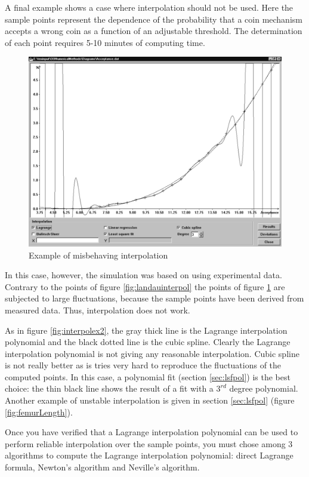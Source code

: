A final example shows a case where interpolation should not be
used. Here the sample points represent the dependence of the
probability that a coin mechanism accepts a wrong coin as a
function of an adjustable threshold. The determination of each
point requires 5-10 minutes of computing time.
\begin{figure}
\label{fig:interpolex4}
\centering\includegraphics[width=12cm]{Figures/BadInterpolation}
\caption{Example of misbehaving interpolation}
\end{figure}
In this case, however, the simulation was based on using
experimental data. Contrary to the points of figure
\ref{fig:landauinterpol} the points of figure
\ref{fig:interpolex4} are subjected to large fluctuations, because
the sample points have been derived from measured data. Thus,
interpolation does not work.

As in figure \ref{fig:interpolex2}, the gray thick line is the
Lagrange interpolation polynomial and the black dotted line is the
cubic spline. Clearly the Lagrange interpolation polynomial is not
giving any reasonable interpolation. Cubic spline is not really
better as is tries very hard to reproduce the fluctuations of the
computed points. In this case, a polynomial fit (\cf section
\ref{sec:lsfpol}) is the best choice: the thin black line shows
the result of a fit with a $3^{rd}$ degree polynomial.
Another example of unstable interpolation is given in
section \ref{sec:lsfpol} (figure \ref{fig:femurLength}).

 Once
you have verified that a Lagrange interpolation polynomial can be
used to perform reliable interpolation over the sample points, you
must chose among 3 algorithms to compute the Lagrange
interpolation polynomial: direct Lagrange formula, Newton's
algorithm and Neville's algorithm.

